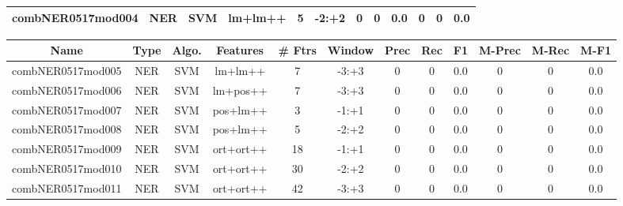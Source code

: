 \documentclass[a4paper]{article}
\begin{document}
\begin{landscape}
\begin{center}
\begin{tabular}{ |c|c|c|c|c|c|c|c|c|c|c|c|}
 
 	
 	\small{ combNER0517mod004 } & \small{ NER} & \small{  SVM }  & lm+lm++  &  5 &  \small{  -2:+2 }  &  0 & 0 & 0.0  &  0 & 0 & 0.0 \\
 	
 \hline
\end{tabular}
\end{center}




\begin{center}
\begin{tabular}{ |c|c|c|c|c|c|c|c|c|c|c|c|} 
 \hline
 	Name & Type & Algo. & Features & \# Ftrs & Window & Prec & Rec & F1 & M-Prec & M-Rec & M-F1\\
 \hline

 	

 
 	
 	\small{ combNER0517mod005 } & \small{ NER} & \small{  SVM }  & lm+lm++  &  7 &  \small{  -3:+3 }  &  0 & 0 & 0.0  &  0 & 0 & 0.0 \\
 	

 
 	
 	\small{ combNER0517mod006 } & \small{ NER} & \small{  SVM }  & lm+pos++  &  7 &  \small{  -3:+3 }  &  0 & 0 & 0.0  &  0 & 0 & 0.0 \\
 	

 
 	
 	\small{ combNER0517mod007 } & \small{ NER} & \small{  SVM }  & pos+lm++  &  3 &  \small{  -1:+1 }  &  0 & 0 & 0.0  &  0 & 0 & 0.0 \\
 	

 
 	
 	\small{ combNER0517mod008 } & \small{ NER} & \small{  SVM }  & pos+lm++  &  5 &  \small{  -2:+2 }  &  0 & 0 & 0.0  &  0 & 0 & 0.0 \\
 	

 
 	
 	\small{ combNER0517mod009 } & \small{ NER} & \small{  SVM }  & ort+ort++  &  18 &  \small{  -1:+1 }  &  0 & 0 & 0.0  &  0 & 0 & 0.0 \\
 	

 
 	
 	\small{ combNER0517mod010 } & \small{ NER} & \small{  SVM }  & ort+ort++  &  30 &  \small{  -2:+2 }  &  0 & 0 & 0.0  &  0 & 0 & 0.0 \\
 	

 
 	
 	\small{ combNER0517mod011 } & \small{ NER} & \small{  SVM }  & ort+ort++  &  42 &  \small{  -3:+3 }  &  0 & 0 & 0.0  &  0 & 0 & 0.0 \\
 	


\end{tabular}
\end{center}
\end{landscape}
\end{document}
